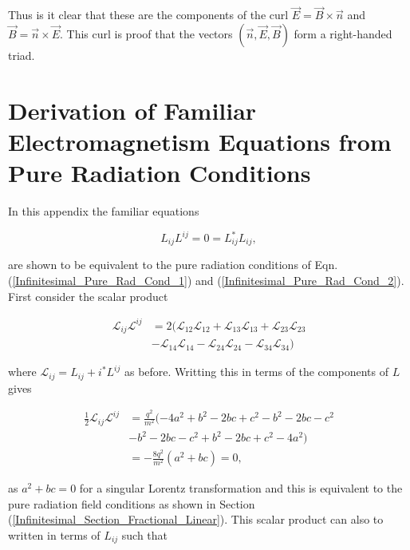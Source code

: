 \begin{appendix}
\noindent Thus is it clear that these are the components of the curl $\vec{E} = \vec{B} \times \vec{n}$ and $\vec{B} = \vec{n} \times \vec{E}$. This curl is proof that the vectors $(\vec{n}, \vec{E}, \vec{B})$ form a right-handed triad. 

\section{Derivation of Familiar Electromagnetism Equations from Pure Radiation Conditions}\label{Appendix_Familair_EM_from_Pure_Cond}

In this appendix the familiar equations \cite[p. 42]{Schild_Lectures}

\begin{equation*}
L_{ij}L^{ij} = 0 = L_{ij} ^{*}L_{ij},
\end{equation*}

\noindent are shown to be equivalent to the pure radiation conditions of Eqn.(\ref{Infinitesimal_Pure_Rad_Cond_1}) and (\ref{Infinitesimal_Pure_Rad_Cond_2}). First consider the scalar product

\begin{align*}
\mathcal{L}_{ij} \mathcal{L}^{ij} & = 2( \mathcal{L}_{12}\mathcal{L}_{12}+\mathcal{L}_{13} \mathcal{L}_{13}+\mathcal{L}_{23}\mathcal{L}_{23} \\
                                  & - \mathcal{L}_{14} \mathcal{L}_{14} - \mathcal{L}_{24}\mathcal{L}_{24} - \mathcal{L}_{34}\mathcal{L}_{34})
\end{align*}

\noindent where $\mathcal{L}_{ij} = L_{ij} + i ^{*}L^{ij}$ as before. Writting this in terms of the components of $L$ gives

\begin{align*}
\frac{1}{2} \mathcal{L}_{ij} \mathcal{L}^{ij} & = \frac{q^2}{m^2} ( -4a^2 + b^2 - 2bc + c^2 - b^2 - 2bc - c^2 \\
                                              & - b^2 - 2bc - c^2 + b^2 - 2bc + c^2 - 4a^2) \\
                                              & = -\frac{8q^2}{m^2} (a^2 + bc) = 0,  
\end{align*}

\noindent as $a^2 + bc = 0$ for a singular Lorentz transformation and this is equivalent to the pure radiation field conditions as shown in Section (\ref{Infinitesimal_Section_Fractional_Linear}). This scalar product can also to written in terms of $L_{ij}$ such that


\end{appendix}
